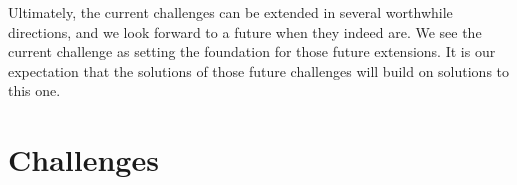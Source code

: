 \documentclass[runningheads]{llncs}
\begin{document}
Ultimately, the current challenges can be extended in several
worthwhile directions, and we look forward to a future when they
indeed are. We see the current challenge as setting
the foundation for those future extensions. It is our expectation that
the solutions of those future challenges will build on solutions
to this one.




\clearpage
\appendix
\section{Challenges}\label{app:challenges}

\end{document}
